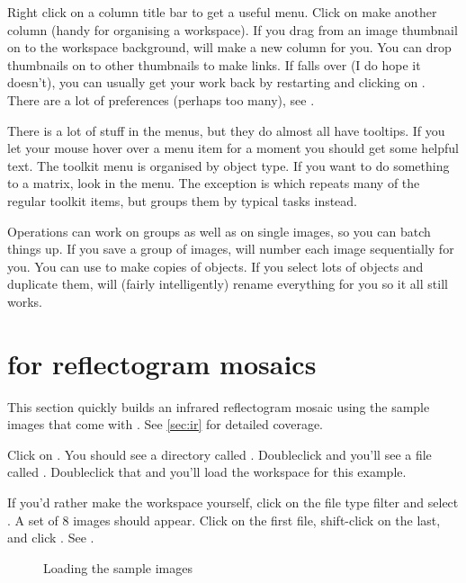 Right click on a column title bar to get a useful menu. Click on
 make another column (handy for organising
a workspace). If you drag from an image thumbnail on to the workspace
background, \nip{} will make a new column for you. You can drop thumbnails
on to other thumbnails to make links.  If \nip{} falls over (I do hope
it doesn't), you can usually get your work back by restarting \nip{} and
clicking on .  There are a lot
of preferences (perhaps too many), see .

There is a lot of stuff in the  menus, but they do almost
all have tooltips. If you let your mouse hover over a menu item for a
moment you should get some helpful text. The toolkit menu is organised by
object type. If you want to do something to a matrix, look in the
 menu. The exception is 
which repeats many of the regular toolkit items, but groups them by typical
tasks instead.

Operations can work on groups as well as on single images, so you can batch
things up. If you save a group of images, \nip{} will number each image
sequentially for you.  You can use  to make copies
of objects. If you select lots of objects and duplicate them, \nip{} will
(fairly intelligently) rename everything for you so it all still works.

\section{\nip{} for reflectogram mosaics}

This section quickly builds an infrared reflectogram mosaic using the
sample images that come with \nip{}. See \cref{sec:ir} for detailed
coverage.

Click on . 
You should see a directory called . Doubleclick and
you'll see a file called . Doubleclick that and you'll load
the workspace for this example.

If you'd rather make the workspace yourself, click on the file type filter and
select . A set of 8 images should appear.  Click on the first
file, shift-click on the last, and click . See .

\begin{figure}
\caption{Loading the sample images}
\end{figure}

